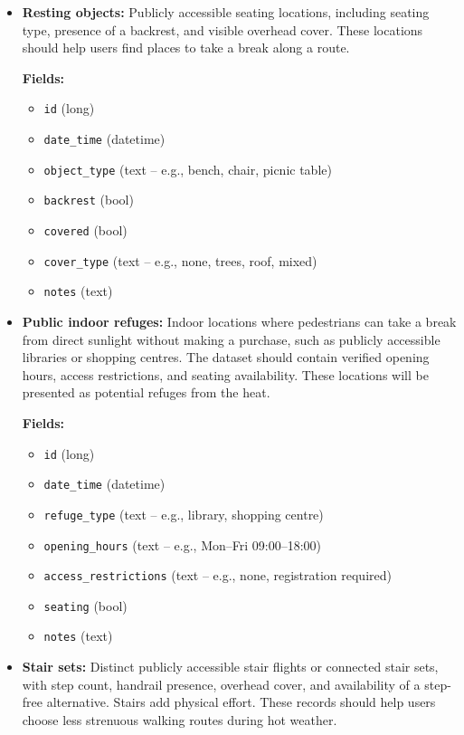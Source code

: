 \documentclass[11pt,a4paper]{article}
\begin{document}
\begin{itemize}
\item
  \textbf{Resting objects:} Publicly accessible seating locations, including seating type, presence of a backrest, and visible overhead cover. These locations should help users find places to take a break along a route.

  \textbf{Fields:}
  
  \begin{itemize}
    \item \texttt{id} (long)
    \item \texttt{date\_time} (datetime)
    \item \texttt{object\_type} (text -- e.g., bench, chair, picnic table)
    \item \texttt{backrest} (bool)
    \item \texttt{covered} (bool)
    \item \texttt{cover\_type} (text -- e.g., none, trees, roof, mixed)
    \item \texttt{notes} (text)
  \end{itemize}

\item
  \textbf{Public indoor refuges:} Indoor locations where pedestrians can take a break from direct sunlight without making a purchase, such as publicly accessible libraries or shopping centres. The dataset should contain verified opening hours, access restrictions, and seating availability. These locations will be presented as potential refuges from the heat.

  \textbf{Fields:}
  
  \begin{itemize}
    \item \texttt{id} (long)
    \item \texttt{date\_time} (datetime)
    \item \texttt{refuge\_type} (text -- e.g., library, shopping centre)
    \item \texttt{opening\_hours} (text -- e.g., Mon--Fri 09:00--18:00)
    \item \texttt{access\_restrictions} (text -- e.g., none, registration required)
    \item \texttt{seating} (bool)
    \item \texttt{notes} (text)
  \end{itemize}

\item
  \textbf{Stair sets:} Distinct publicly accessible stair flights or connected stair sets, with step count, handrail presence, overhead cover, and availability of a step-free alternative. Stairs add physical effort. These records should help users choose less strenuous walking routes during hot weather.
  

\end{itemize}
\end{document}
